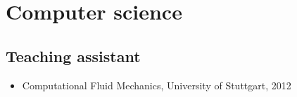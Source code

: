\documentclass[11pt,a4paper]{article}
\begin{document}
\section*{Computer science}

\subsection*{Teaching assistant}
\begin{itemize}
\item Computational Fluid Mechanics, University of Stuttgart, 2012
\end{itemize}





\label{LastPage}             
\end{document}

